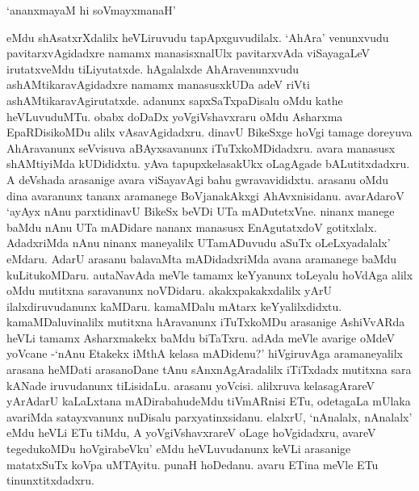 \begin{shloka}
`ananxmayaM hi soVmayxmanaH'
\end{shloka}

\noindent eMdu shAsatxrXdalilx heVLiruvudu tapApxguvudilalx. `AhAra' venunxvudu pavitarxvAgidadxre namamx manasisxnalUlx pavitarxvAda viSayagaLeV irutatxveMdu tiLiyutatxde. hAgalalxde AhAravenunxvudu ashAMtikaravAgidadxre namamx manasusxkUDa adeV riVti ashAMtikaravAgirutatxde. adanunx sapxSaTxpaDisalu oMdu kathe heVLuvuduMTu. obabx doDaDx yoVgiVshavxraru oMdu Asharxma EpaRDisikoMDu alilx vAsavAgidadxru. dinavU BikeSxge hoVgi tamage doreyuva AhAravanunx seVvisuva aBAyxsavanunx iTuTxkoMDidadxru. avara manasusx shAMtiyiMda kUDididxtu. yAva tapupxkelasakUkx oLagAgade bALutitxdadxru. A deVshada arasanige avara viSayavAgi bahu gwravavididxtu. arasanu oMdu dina avaranunx tananx aramanege BoVjanakAkxgi AhAvxnisidanu. avarAdaroV `ayAyx nAnu parxtidinavU BikeSx beVDi UTa mADutetxVne. ninanx manege baMdu nAnu UTa mADidare nananx manasusx EnAgutatxdoV gotitxlalx. AdadxriMda nAnu ninanx maneyalilx UTamADuvudu aSuTx oLeLxyadalalx' eMdaru. AdarU arasanu balavaMta mADidadxriMda avana aramanege baMdu kuLitukoMDaru. autaNavAda meVle tamamx keYyanunx toLeyalu hoVdAga alilx oMdu mutitxna saravanunx noVDidaru. akakxpakakxdalilx yArU ilalxdiruvudanunx kaMDaru. kamaMDalu mAtarx keYyalilxdidxtu. kamaMDaluvinalilx mutitxna hAravanunx iTuTxkoMDu arasanige AshiVvARda heVLi tamamx Asharxmakekx baMdu biTaTxru. adAda meVle avarige oMdeV yoVcane -`nAnu Etakekx iMthA kelasa mADidenu?' hiVgiruvAga aramaneyalilx arasana heMDati arasanoDane tAnu sAnxnAgAradalilx iTiTxdadx mutitxna sara kANade iruvudanunx tiLisidaLu. arasanu yoVcisi. alilxruva kelasagArareV yArAdarU kaLaLxtana mADirabahudeMdu tiVmARnisi ETu, odetagaLa mUlaka avariMda satayxvanunx nuDisalu parxyatinxsidanu. elalxrU, `nAnalalx, nAnalalx' eMdu heVLi ETu tiMdu, A yoVgiVshavxrareV oLage hoVgidadxru, avareV tegedukoMDu hoVgirabeVku' eMdu heVLuvudanunx keVLi arasanige matatxSuTx koVpa uMTAyitu. punaH hoDedanu. avaru ETina meVle ETu tinunxtitxdadxru.

